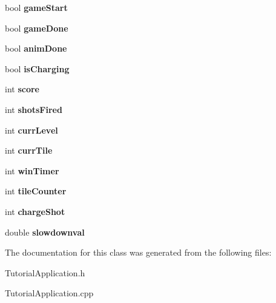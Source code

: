 \begin{DoxyCompactItemize}
\item 
\hypertarget{classTutorialApplication_a65bf287d5378adae88f25008fb47ab59}{bool {\bfseries game\-Start}}\label{classTutorialApplication_a65bf287d5378adae88f25008fb47ab59}

\item 
\hypertarget{classTutorialApplication_accfd016221017e94d955b4ec37e054b0}{bool {\bfseries game\-Done}}\label{classTutorialApplication_accfd016221017e94d955b4ec37e054b0}

\item 
\hypertarget{classTutorialApplication_a6162dd5f8bec6ecb6990dc88e82f72ed}{bool {\bfseries anim\-Done}}\label{classTutorialApplication_a6162dd5f8bec6ecb6990dc88e82f72ed}

\item 
\hypertarget{classTutorialApplication_a8050d67ad823b92a300f13756e32b21c}{bool {\bfseries is\-Charging}}\label{classTutorialApplication_a8050d67ad823b92a300f13756e32b21c}

\item 
\hypertarget{classTutorialApplication_ade5553b1d6cbeeb5f3367a823895c161}{int {\bfseries score}}\label{classTutorialApplication_ade5553b1d6cbeeb5f3367a823895c161}

\item 
\hypertarget{classTutorialApplication_af656e918f4a9bf93f0da609314e83e19}{int {\bfseries shots\-Fired}}\label{classTutorialApplication_af656e918f4a9bf93f0da609314e83e19}

\item 
\hypertarget{classTutorialApplication_a329b55acd7a24fa0c3fe53ac937a183d}{int {\bfseries curr\-Level}}\label{classTutorialApplication_a329b55acd7a24fa0c3fe53ac937a183d}

\item 
\hypertarget{classTutorialApplication_a417b106d440df57f996daa502bdbd45b}{int {\bfseries curr\-Tile}}\label{classTutorialApplication_a417b106d440df57f996daa502bdbd45b}

\item 
\hypertarget{classTutorialApplication_abfc6d9bb9ebc4dcdcbbf497a7a8c40bf}{int {\bfseries win\-Timer}}\label{classTutorialApplication_abfc6d9bb9ebc4dcdcbbf497a7a8c40bf}

\item 
\hypertarget{classTutorialApplication_aa1a60a04b27f10c5b805dabf8af99d1d}{int {\bfseries tile\-Counter}}\label{classTutorialApplication_aa1a60a04b27f10c5b805dabf8af99d1d}

\item 
\hypertarget{classTutorialApplication_a269ce7c173733feed9bcb045e60a51ed}{int {\bfseries charge\-Shot}}\label{classTutorialApplication_a269ce7c173733feed9bcb045e60a51ed}

\item 
\hypertarget{classTutorialApplication_a5d78d8c82a025fba1401759153fa2be1}{double {\bfseries slowdownval}}\label{classTutorialApplication_a5d78d8c82a025fba1401759153fa2be1}

\end{DoxyCompactItemize}


The documentation for this class was generated from the following files\-:\begin{DoxyCompactItemize}
\item 
Tutorial\-Application.\-h\item 
Tutorial\-Application.\-cpp\end{DoxyCompactItemize}
